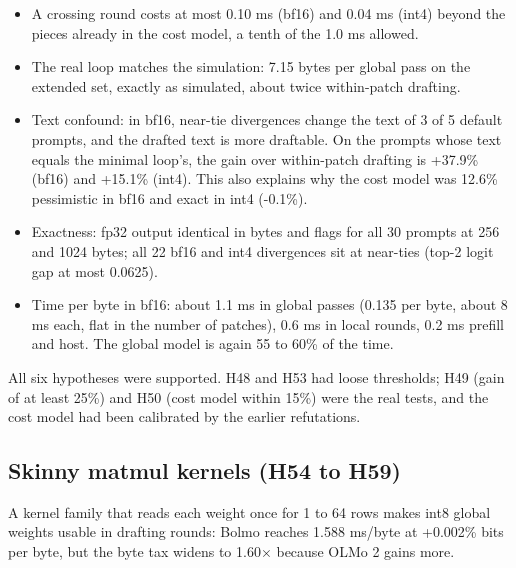 \documentclass[11pt,a4paper]{article}
\newcommand{\x}{\ensuremath{\times}}
\begin{document}
\begin{itemize}
\item
  A crossing round costs at most 0.10 ms (bf16) and 0.04 ms (int4) beyond the pieces already in the cost model, a tenth of the 1.0 ms allowed.
\item
  The real loop matches the simulation: 7.15 bytes per global pass on the extended set, exactly as simulated, about twice within-patch drafting.
\item
  Text confound: in bf16, near-tie divergences change the text of 3 of 5 default prompts, and the drafted text is more draftable. On the prompts whose text equals the minimal loop's, the gain over within-patch drafting is +37.9\% (bf16) and +15.1\% (int4). This also explains why the cost model was 12.6\% pessimistic in bf16 and exact in int4 (-0.1\%).
\item
  Exactness: fp32 output identical in bytes and flags for all 30 prompts at 256 and 1024 bytes; all 22 bf16 and int4 divergences sit at near-ties (top-2 logit gap at most 0.0625).
\item
  Time per byte in bf16: about 1.1 ms in global passes (0.135 per byte, about 8 ms each, flat in the number of patches), 0.6 ms in local rounds, 0.2 ms prefill and host. The global model is again 55 to 60\% of the time.
\end{itemize}

All six hypotheses were supported. H48 and H53 had loose thresholds; H49 (gain of at least 25\%) and H50 (cost model within 15\%) were the real tests, and the cost model had been calibrated by the earlier refutations.

\subsection{Skinny matmul kernels (H54 to H59)}\label{skinny-matmul-kernels-h54-to-h59}

A kernel family that reads each weight once for 1 to 64 rows makes int8 global weights usable in drafting rounds: Bolmo reaches 1.588 ms/byte at +0.002\% bits per byte, but the byte tax widens to 1.60\x{} because OLMo 2 gains more.
\end{document}
